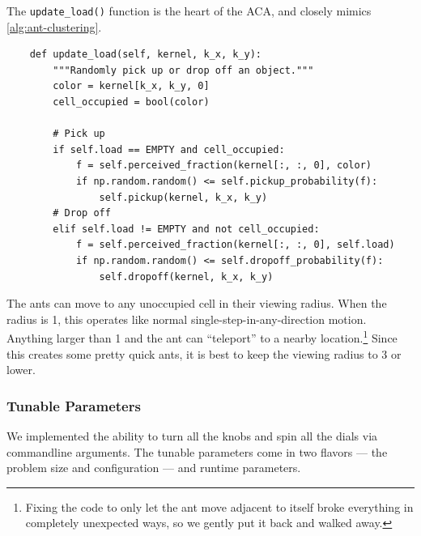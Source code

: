 \documentclass[12pt]{article}
\begin{document}
The \texttt{update_load()} function is the heart of the ACA, and closely mimics \autoref{alg:ant-clustering}.

\begin{verbatim}
    def update_load(self, kernel, k_x, k_y):
        """Randomly pick up or drop off an object."""
        color = kernel[k_x, k_y, 0]
        cell_occupied = bool(color)

        # Pick up
        if self.load == EMPTY and cell_occupied:
            f = self.perceived_fraction(kernel[:, :, 0], color)
            if np.random.random() <= self.pickup_probability(f):
                self.pickup(kernel, k_x, k_y)
        # Drop off
        elif self.load != EMPTY and not cell_occupied:
            f = self.perceived_fraction(kernel[:, :, 0], self.load)
            if np.random.random() <= self.dropoff_probability(f):
                self.dropoff(kernel, k_x, k_y)
\end{verbatim}

The ants can move to any unoccupied cell in their viewing radius.
When the radius is 1, this operates like normal single-step-in-any-direction motion.
Anything larger than 1 and the ant can ``teleport'' to a nearby location.\footnote{Fixing the code to only let the ant move adjacent to itself broke everything in completely unexpected ways, so we gently put it back and walked away.}
Since this creates some pretty quick ants, it is best to keep the viewing radius to 3 or lower.

\subsubsection{Tunable Parameters}

We implemented the ability to turn all the knobs and spin all the dials via commandline arguments.
The tunable parameters come in two flavors --- the problem size and configuration --- and runtime parameters.
\end{document}

